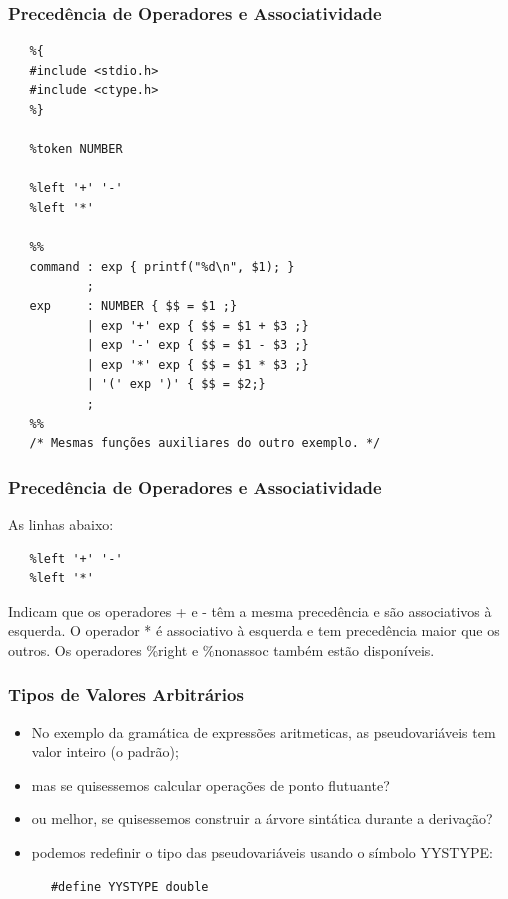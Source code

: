 \documentclass[table]{beamer}
\begin{document}
\begin{frame}[fragile]
   \frametitle{Precedência de Operadores e Associatividade}
   \scriptsize
   \begin{verbatim}
   %{
   #include <stdio.h>
   #include <ctype.h>
   %}

   %token NUMBER
   
   %left '+' '-'
   %left '*'

   %%
   command : exp { printf("%d\n", $1); }
           ;
   exp     : NUMBER { $$ = $1 ;}
           | exp '+' exp { $$ = $1 + $3 ;}
           | exp '-' exp { $$ = $1 - $3 ;}           
           | exp '*' exp { $$ = $1 * $3 ;}           
           | '(' exp ')' { $$ = $2;}
           ;
   %%
   /* Mesmas funções auxiliares do outro exemplo. */
   \end{verbatim}
\end{frame}

\begin{frame}[fragile]
   \frametitle{Precedência de Operadores e Associatividade}
   As linhas abaixo:
   \begin{verbatim}
   %left '+' '-'
   %left '*'
   \end{verbatim}
   Indicam que os operadores + e - têm a mesma precedência e são associativos à esquerda. O operador * é associativo à esquerda e tem precedência maior que os outros. Os operadores \%right e \%nonassoc também estão disponíveis.
\end{frame}

\begin{frame}[fragile]
   \frametitle{Tipos de Valores Arbitrários}
   \begin{itemize}
      \item No exemplo da gramática de expressões aritmeticas, as pseudovariáveis tem valor inteiro (o padrão);
      \item mas se quisessemos calcular operações de ponto flutuante?
      \item ou melhor, se quisessemos construir a árvore sintática durante a derivação?
      \item podemos redefinir o tipo das pseudovariáveis usando o símbolo YYSTYPE:
   \end{itemize}
   \begin{verbatim}
      #define YYSTYPE double
   \end{verbatim}
\end{frame}
\end{document}
